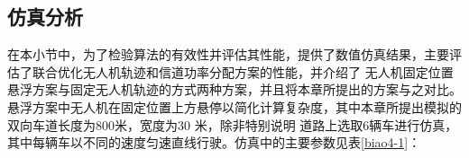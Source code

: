 \subsection{仿真分析}\label{section4-5-2}
在本小节中，为了检验算法的有效性并评估其性能，提供了数值仿真结果，主要评估了联合优化无人机轨迹和信道功率分配方案的性能，并介绍了
无人机固定位置悬浮方案与固定无人机轨迹的方式两种方案，并且将本章所提出的方案与之对比。
悬浮方案中无人机在固定位置上方悬停以简化计算复杂度，其中本章所提出模拟的双向车道长度为800米，宽度为30 米，除非特别说明
道路上选取6辆车进行仿真，其中每辆车以不同的速度匀速直线行驶。仿真中的主要参数见表\ref{biao4-1}：

